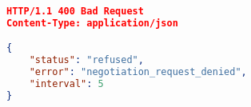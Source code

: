 

\begin{lstlisting}[language=json,firstnumber=1]
HTTP/1.1 400 Bad Request
Content-Type: application/json

{
    "status": "refused",
    "error": "negotiation_request_denied",
    "interval": 5
}

\end{lstlisting}